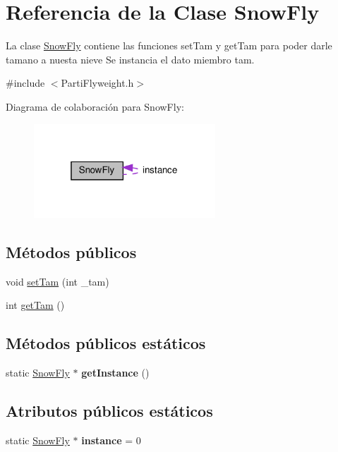 \hypertarget{classSnowFly}{}\section{Referencia de la Clase Snow\+Fly}
\label{classSnowFly}


La clase \hyperlink{classSnowFly}{Snow\+Fly} contiene las funciones set\+Tam y get\+Tam para poder darle tamano a nuesta nieve  Se instancia el dato miembro tam.  




{\ttfamily \#include $<$Parti\+Flyweight.\+h$>$}



Diagrama de colaboración para Snow\+Fly\+:
\nopagebreak
\begin{figure}[H]
\begin{center}
\leavevmode
\includegraphics[width=193pt]{classSnowFly__coll__graph}
\end{center}
\end{figure}
\subsection*{Métodos públicos}
\begin{DoxyCompactItemize}
\item 
void \hyperlink{classSnowFly_a1068f2ce770daa2932732ec6c94715a9}{set\+Tam} (int \+\_\+tam)
\item 
int \hyperlink{classSnowFly_a6677ebdc7b0cb9bb7ea1b90292b18ef2}{get\+Tam} ()
\end{DoxyCompactItemize}
\subsection*{Métodos públicos estáticos}
\begin{DoxyCompactItemize}
\item 
\mbox{\label{classSnowFly_a2a1b39f6b9f85311222e82e68d131650}} 
static \hyperlink{classSnowFly}{Snow\+Fly} $\ast$ {\bfseries get\+Instance} ()
\end{DoxyCompactItemize}
\subsection*{Atributos públicos estáticos}
\begin{DoxyCompactItemize}
\item 
\mbox{\label{classSnowFly_a7d6143f2d7e5fb5650afca3f6436f208}} 
static \hyperlink{classSnowFly}{Snow\+Fly} $\ast$ {\bfseries instance} = 0
\end{DoxyCompactItemize}


